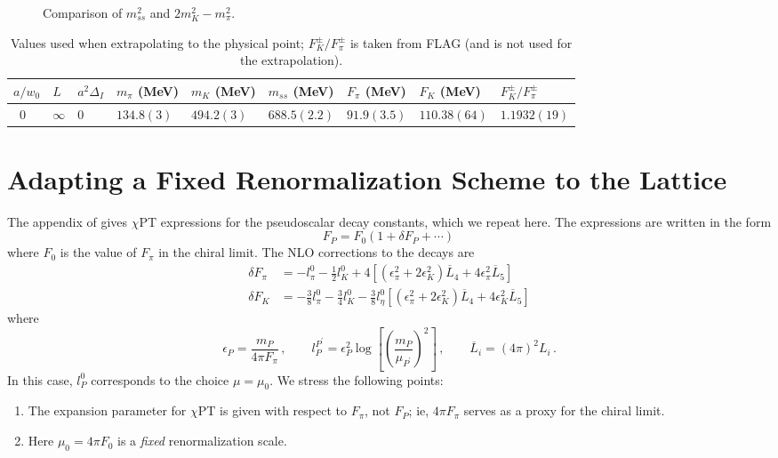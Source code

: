 \documentclass[prd,tightenlines,preprintnumbers,showpacs,superscriptaddress,notitlepage,eqsecnum,floatfix,notitlepage]{revtex4-1}
\newcommand{\includegraphicsifexists}[2][]{\IfFileExists{#2}{\texttt{[image: \#2]}}{\texttt{[image: \#2]}}}
\begin{document}
\begin{figure}
	\includegraphicsifexists[width=0.9\textwidth]{./../tmp/mss_vs_mk_mpi.pdf}
	\caption{Comparison of $m_{ss}^2$ and $2m_K^2 - m_\pi^2$.}
	\label{fig:mss}
\end{figure}

\begin{table}[]
	\begin{ruledtabular}
		\begin{tabular}{lll||lll||lll}
		$a/w_0$ & $L$      & $a^2 \Delta_I$ & $m_\pi$ (MeV)   & $m_K$ (MeV)     & $m_{ss}$ (MeV)   & $F_\pi$ (MeV)   & $F_K$ (MeV)      & $F_K^\pm/F_\pi^\pm$ \\
		\hline\
		0       & $\infty$ & 0              & $134.8(3)$ & $494.2(3)$& $688.5(2.2)$ & $91.9(3.5)$ & $110.38(64)$ & $1.1932(19)$       \\
		\end{tabular}
	\end{ruledtabular}
\caption{Values used when extrapolating to the physical point; $F_K^\pm/F_\pi^\pm$ is taken from FLAG (and is not used for the extrapolation).}
\label{table:phys_point_values}
\end{table}

\section{Adapting a Fixed Renormalization Scheme to the Lattice}
The appendix of \cite{Amoros:1999dp} gives $\chi$PT expressions for the pseudoscalar decay constants, which we repeat here. The expressions are written in the form
\begin{equation}
F_P = F_0 \left(1 + \delta F_P + \cdots \right) \, 
\end{equation}
where $F_0$ is the value of $F_\pi$ in the chiral limit. The NLO corrections to the decays are
\begin{align}
\delta F_\pi &= - l^0_\pi - \frac12 l^0_K + 4 \left[ 
	\left( \epsilon^2_\pi + 2 \epsilon^2_K \right) \overline L_4 + 4 \epsilon^2_\pi  \overline L_5
\right] \\
\delta F_K &= - \frac38 l^0_\pi - \frac34  l^0_K - \frac38  l^0_\eta \left[ 
\left( \epsilon^2_\pi + 2 \epsilon^2_K \right) \overline L_4 + 4 \epsilon^2_K  \overline L_5
\right]
\end{align}
where
\begin{equation}
\epsilon_P = \frac{m_P}{4 \pi F_\pi} \, , \qquad 
l^{P^\prime}_P = \epsilon^2_P \log \left[\left( \frac{m_P}{\mu_{P^\prime}}\right)^2\right] \, , \qquad
\overline L_i = (4\pi)^2 L_i \, .
\end{equation}
In this case, $l^0_P$ corresponds to the choice $\mu=\mu_0$. We stress the following points:
\begin{enumerate}
	\item The expansion parameter for $\chi$PT is given with respect to $F_\pi$, not $F_P$; ie,  $4 \pi F_\pi$ serves as a proxy for the chiral limit.
	\item Here $\mu_0 = 4 \pi F_0$ is a \emph{fixed} renormalization scale.
\end{enumerate}
\end{document}
